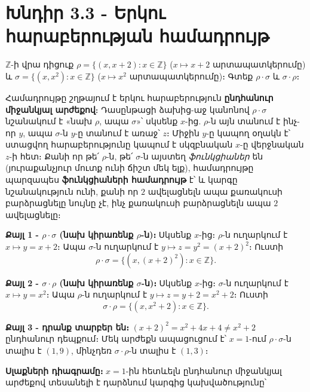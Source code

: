 \documentclass[11pt,a4paper]{article}
\newcommand{\Z}{\mathbb{Z}}
\begin{document}
\section*{Խնդիր 3.3 - Երկու հարաբերության համադրույթ}

\begin{problembox}[3.3]
$\Z$-ի վրա դիցուք $\rho=\{(x,x+2):x\in\Z\}$ ($x\mapsto x+2$ արտապատկերումը) և
$\sigma=\{(x,x^2):x\in\Z\}$ ($x\mapsto x^2$ արտապատկերումը)։ Գտեք $\rho\cdot\sigma$ և $\sigma\cdot\rho$։
\end{problembox}

\begin{ideabox}
Համադրույթը շղթայում է երկու հարաբերություն \textbf{ընդհանուր միջանկյալ արժեքով}։ Դասընթացի ձախից-աջ
կանոնով $\rho\cdot\sigma$ նշանակում է «նախ $\rho$, ապա $\sigma$»՝ սկսենք $x$-ից. $\rho$-ն այն տանում է
ինչ-որ $y$, ապա $\sigma$-ն $y$-ը տանում է առաջ՝ $z$։ Միջին $y$-ը կապող օղակն է՝ ստացվող
հարաբերությունը կապում է սկզբնական $x$-ը վերջնական $z$-ի հետ։ Քանի որ թե՛ $\rho$-ն, թե՛ $\sigma$-ն այստեղ
\emph{ֆունկցիաներ} են (յուրաքանչյուր մուտք ունի ճիշտ մեկ ելք), համադրույթը պարզապես \textbf{ֆունկցիաների
համադրույթ} է՝ և կարգը նշանակություն ունի, քանի որ $2$ ավելացնելն ապա քառակուսի բարձրացնելը նույնը չէ,
ինչ քառակուսի բարձրացնելն ապա $2$ ավելացնելը։
\end{ideabox}

\textbf{Քայլ 1 - $\rho\cdot\sigma$ (նախ կիրառենք $\rho$-ն)։}
Սկսենք $x$-ից։ $\rho$-ն ուղարկում է $x\mapsto y=x+2$։ Ապա $\sigma$-ն ուղարկում է
$y\mapsto z=y^2=(x+2)^2$։ Ուստի
\[\rho\cdot\sigma=\{(x,(x+2)^2):x\in\Z\}.\]

\textbf{Քայլ 2 - $\sigma\cdot\rho$ (նախ կիրառենք $\sigma$-ն)։}
Սկսենք $x$-ից։ $\sigma$-ն ուղարկում է $x\mapsto y=x^2$։ Ապա $\rho$-ն ուղարկում է $y\mapsto z=y+2=x^2+2$։
Ուստի
\[\sigma\cdot\rho=\{(x,x^2+2):x\in\Z\}.\]

\textbf{Քայլ 3 - դրանք տարբեր են։} $(x+2)^2=x^2+4x+4\neq x^2+2$ ընդհանուր դեպքում։ Մեկ արժեքն
ապացուցում է՝ $x=1$-ում $\rho\cdot\sigma$-ն տալիս է $(1,9)$, մինչդեռ $\sigma\cdot\rho$-ն տալիս է
$(1,3)$։

\textbf{Սլաքների դիագրամը։} $x=1$-ին հետևելն ընդհանուր միջանկյալ արժեքով տեսանելի է դարձնում
կարգից կախվածությունը՝
\end{document}
